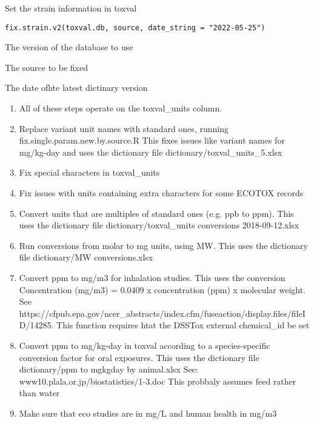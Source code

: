 \documentclass[letterpaper]{book}
\begin{document}
%
\begin{Description}\relax
Set the strain information in toxval
\end{Description}
%
\begin{Usage}
\begin{verbatim}
fix.strain.v2(toxval.db, source, date_string = "2022-05-25")
\end{verbatim}
\end{Usage}
%
\begin{Arguments}
\begin{ldescription}
\item[\code{toxval.db}] The version of the database to use

\item[\code{source}] The source to be fixed

\item[\code{date\_string}] The date ofhte latest dictinary version
\end{ldescription}
\end{Arguments}
%
\begin{Description}\relax
\begin{enumerate}

\item{} All of these steps operate on the toxval\_units column.
\item{} Replace variant unit names with standard ones, running fix.single.param.new.by.source.R
This fixes issues like variant names for mg/kg-day and uses the dictionary
file dictionary/toxval\_units\_5.xlsx
\item{} Fix special characters in toxval\_units
\item{} Fix issues with units containing extra characters for some ECOTOX records
\item{} Convert units that are multiples of standard ones (e.g. ppb to ppm). This
uses the dictionary file dictionary/toxval\_units conversions 2018-09-12.xlsx
\item{} Run conversions from molar to mg units, using MW. This uses the dictionary file
dictionary/MW conversions.xlsx
\item{} Convert ppm to mg/m3 for inhalation studies. This uses the conversion Concentration
(mg/m3) = 0.0409 x concentration (ppm) x molecular weight. See
https://cfpub.epa.gov/ncer\_abstracts/index.cfm/fuseaction/display.files/fileID/14285.
This function requires htat the DSSTox external chemical\_id be set
\item{} Convert ppm to mg/kg-day in toxval according to a species-specific
conversion factor for oral exposures. This uses the dictionary file
dictionary/ppm to mgkgday by animal.xlsx
See: www10.plala.or.jp/biostatistics/1-3.doc
This probbaly assumes feed rather than water
\item{} Make sure that eco studies are in mg/L and human health in mg/m3

\end{enumerate}

\end{Description}
\end{document}
